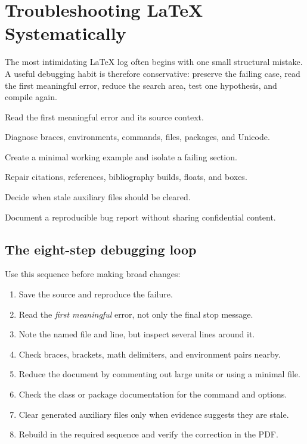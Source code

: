 \chapter{Troubleshooting \LaTeX{} Systematically}
\label{chap:troubleshooting}

The most intimidating \LaTeX{} log often begins with one small structural mistake.
A useful debugging habit is therefore conservative: preserve the failing case,
read the first meaningful error, reduce the search area, test one hypothesis,
and compile again.

\begin{learningoutcomes}
  \item Read the first meaningful error and its source context.
  \item Diagnose braces, environments, commands, files, packages, and Unicode.
  \item Create a minimal working example and isolate a failing section.
  \item Repair citations, references, bibliography builds, floats, and boxes.
  \item Decide when stale auxiliary files should be cleared.
  \item Document a reproducible bug report without sharing confidential content.
\end{learningoutcomes}

\section{The eight-step debugging loop}

Use this sequence before making broad changes:

\begin{enumerate}
  \item Save the source and reproduce the failure.
  \item Read the \emph{first meaningful} error, not only the final stop message.
  \item Note the named file and line, but inspect several lines around it.
  \item Check braces, brackets, math delimiters, and environment pairs nearby.
  \item Reduce the document by commenting out large units or using a minimal file.
  \item Check the class or package documentation for the command and options.
  \item Clear generated auxiliary files only when evidence suggests they are stale.
  \item Rebuild in the required sequence and verify the correction in the PDF.
\end{enumerate}

